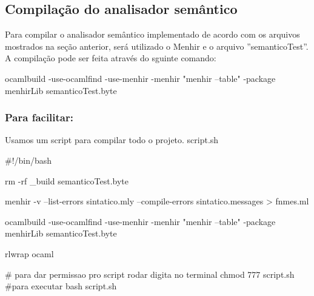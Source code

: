 \documentclass[12pt,a4paper,twoside]{article}
\begin{document}
\subsection{Compilação do analisador semântico}
Para compilar o analisador semântico implementado de acordo com os arquivos mostrados na seção anterior, será utilizado o Menhir e o arquivo ”semanticoTest”. A compilação pode ser feita através do sguinte comando:
\begin{terminal}
ocamlbuild -use-ocamlfind -use-menhir -menhir "menhir --table" -package menhirLib semanticoTest.byte
\end{terminal}

\subsubsection{Para facilitar:}
Usamos um script para compilar todo o projeto.\newline
script.sh
\begin{terminal}
#!/bin/bash

rm -rf  _build  semanticoTest.byte

menhir -v --list-errors sintatico.mly --compile-errors sintatico.messages > fnmes.ml

ocamlbuild -use-ocamlfind -use-menhir -menhir "menhir --table" -package menhirLib semanticoTest.byte

rlwrap ocaml

# para dar permissao pro script rodar digita no terminal chmod 777 script.sh
#para executar bash script.sh
\end{terminal}
\end{document}
